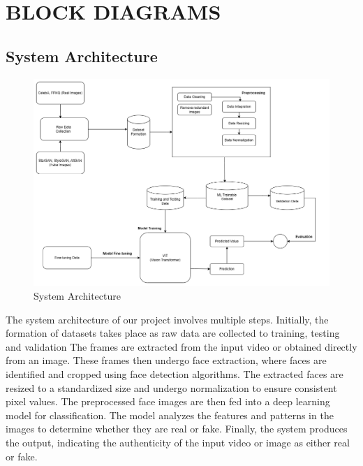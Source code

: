 \section{BLOCK DIAGRAMS}
\subsection{System Architecture}
\begin{figure}[h]
    \centering
    \includegraphics[width= 6.5in ]{img/Model_Architecture.drawio (3).png}
    \caption{{System Architecture}}

\end{figure}
\justify
The system architecture of our project involves multiple steps. Initially, the formation of datasets takes place as raw data are collected to training, testing and validation  The frames are extracted from the input video or obtained directly from an image. These frames then undergo face extraction, where faces are identified and cropped using face detection algorithms. The extracted faces are resized to a standardized size and undergo normalization to ensure consistent pixel values. The preprocessed face images are then fed into a deep learning model for classification. The model analyzes the features and patterns in the images to determine whether they are real or fake. Finally, the system produces the output, indicating the authenticity of the input video or image as either real or fake.
